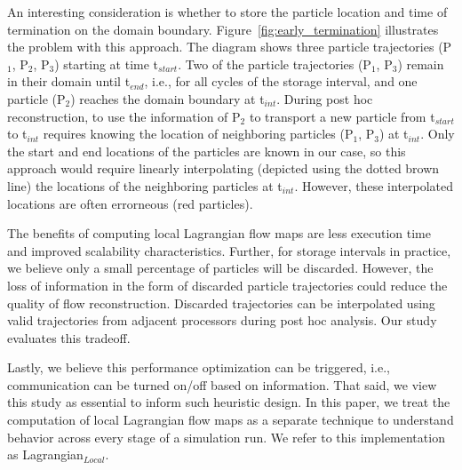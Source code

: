 %
An interesting consideration is whether to store the particle location and time of termination on the domain boundary.
%
Figure~\ref{fig:early_termination} illustrates the problem with this approach.
%
The diagram shows three particle trajectories (P$_{1}$, P$_{2}$, P$_{3}$) starting at time t$_{start}$.
%
Two of the particle trajectories (P$_{1}$, P$_{3}$) remain in their domain until t$_{end}$, i.e., for all cycles of the storage interval, and one particle (P$_{2}$) reaches the domain boundary at t$_{int}$.
%
During post hoc reconstruction, to use the information of P$_{2}$ to transport a new particle from t$_{start}$ to t$_{int}$ requires knowing the location of neighboring particles (P$_{1}$, P$_{3}$) at t$_{int}$.
%
Only the start and end locations of the particles are known in our case, so this approach would require linearly interpolating (depicted using the dotted brown line) the locations of the neighboring particles at t$_{int}$.
%
However, these interpolated locations are often errorneous (red particles).
%
%

The benefits of computing local Lagrangian flow maps are less execution time and improved scalability characteristics. 
%
Further, for storage intervals in practice, we believe only a small percentage of particles will be discarded.
%
However, the loss of information in the form of discarded particle trajectories could reduce the quality of flow reconstruction.
%
Discarded trajectories can be interpolated using valid trajectories from adjacent processors during post hoc analysis.
%
Our study evaluates this tradeoff.
%

Lastly, we believe this performance optimization can be triggered, i.e., communication can be turned on/off based on information. 
%
That said, we view this study as essential to inform such heuristic design. %
%
In this paper, we treat the computation of local Lagrangian flow maps as a separate technique to understand behavior across every stage of a simulation run.
%
We refer to this implementation as Lagrangian$_{Local}$.

